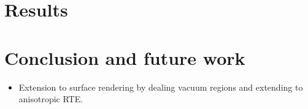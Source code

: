 \section{Results}
\section{Conclusion and future work}

\begin{itemize}
  \item Extension to surface rendering by dealing vacuum regions and extending to anisotropic RTE.
\end{itemize}



%







